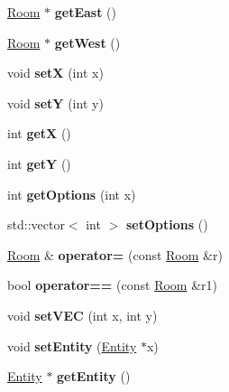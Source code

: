 \begin{DoxyCompactItemize}
\item 
\hypertarget{classRoom_af354b3cc7e014a507175e3cf8f62d6c1}{
\hyperlink{classRoom}{Room} $\ast$ {\bfseries getEast} ()}
\label{classRoom_af354b3cc7e014a507175e3cf8f62d6c1}

\item 
\hypertarget{classRoom_a4fbeb80df2da90b4208b3dc582657a37}{
\hyperlink{classRoom}{Room} $\ast$ {\bfseries getWest} ()}
\label{classRoom_a4fbeb80df2da90b4208b3dc582657a37}

\item 
\hypertarget{classRoom_a38b9a15d87c9b111042cdef673d94121}{
void {\bfseries setX} (int x)}
\label{classRoom_a38b9a15d87c9b111042cdef673d94121}

\item 
\hypertarget{classRoom_aa19629a89101398598341fc87811cc9c}{
void {\bfseries setY} (int y)}
\label{classRoom_aa19629a89101398598341fc87811cc9c}

\item 
\hypertarget{classRoom_a10d9d480ee74da0f9e8f67b3449281fb}{
int {\bfseries getX} ()}
\label{classRoom_a10d9d480ee74da0f9e8f67b3449281fb}

\item 
\hypertarget{classRoom_a800b950cbf7467e52e69fd680ac9781f}{
int {\bfseries getY} ()}
\label{classRoom_a800b950cbf7467e52e69fd680ac9781f}

\item 
\hypertarget{classRoom_aeeaef9d35f76b58a83677383b4e0659f}{
int {\bfseries getOptions} (int x)}
\label{classRoom_aeeaef9d35f76b58a83677383b4e0659f}

\item 
\hypertarget{classRoom_a14d49591d9c12207fb3f91cf4031087d}{
std::vector$<$ int $>$ {\bfseries setOptions} ()}
\label{classRoom_a14d49591d9c12207fb3f91cf4031087d}

\item 
\hypertarget{classRoom_a6fa7112a2775b5eac608a7f4db87e430}{
\hyperlink{classRoom}{Room} \& {\bfseries operator=} (const \hyperlink{classRoom}{Room} \&r)}
\label{classRoom_a6fa7112a2775b5eac608a7f4db87e430}

\item 
\hypertarget{classRoom_a0e35e3d74d5133c8b6691a922fcd7402}{
bool {\bfseries operator==} (const \hyperlink{classRoom}{Room} \&r1)}
\label{classRoom_a0e35e3d74d5133c8b6691a922fcd7402}

\item 
\hypertarget{classRoom_a06b8a422d56708b3e0e1ca494723c21f}{
void {\bfseries setVEC} (int x, int y)}
\label{classRoom_a06b8a422d56708b3e0e1ca494723c21f}

\item 
\hypertarget{classRoom_a2e3dadd26f5fce9e4776a8e1aee60441}{
void {\bfseries setEntity} (\hyperlink{classEntity}{Entity} $\ast$x)}
\label{classRoom_a2e3dadd26f5fce9e4776a8e1aee60441}

\item 
\hypertarget{classRoom_a7df1d5c480024a9e28cba47eac3fc7c2}{
\hyperlink{classEntity}{Entity} $\ast$ {\bfseries getEntity} ()}
\label{classRoom_a7df1d5c480024a9e28cba47eac3fc7c2}

\end{DoxyCompactItemize}


